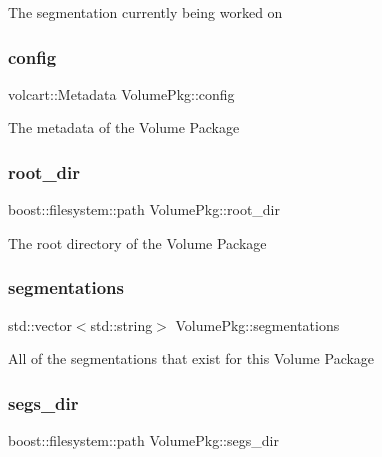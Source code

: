 The segmentation currently being worked on \hypertarget{classVolumePkg_a01960fbb8a1dec9da54f5e2468baeb0e}{}\label{classVolumePkg_a01960fbb8a1dec9da54f5e2468baeb0e} 
\subsubsection{\texorpdfstring{config}{config}}
{\footnotesize\ttfamily volcart\+::\+Metadata Volume\+Pkg\+::config\hspace{0.3cm}{\ttfamily [private]}}

The metadata of the Volume Package \hypertarget{classVolumePkg_a564d5b92303bb807979d0ab09afa8eec}{}\label{classVolumePkg_a564d5b92303bb807979d0ab09afa8eec} 
\subsubsection{\texorpdfstring{root\+\_\+dir}{root\_dir}}
{\footnotesize\ttfamily boost\+::filesystem\+::path Volume\+Pkg\+::root\+\_\+dir\hspace{0.3cm}{\ttfamily [private]}}

The root directory of the Volume Package \hypertarget{classVolumePkg_a2c66b1685cb4b0be679097a61acb822b}{}\label{classVolumePkg_a2c66b1685cb4b0be679097a61acb822b} 
\subsubsection{\texorpdfstring{segmentations}{segmentations}}
{\footnotesize\ttfamily std\+::vector$<$std\+::string$>$ Volume\+Pkg\+::segmentations\hspace{0.3cm}{\ttfamily [private]}}

All of the segmentations that exist for this Volume Package \hypertarget{classVolumePkg_a7093bd35d5d8d7ef0b50a1e182bfbf56}{}\label{classVolumePkg_a7093bd35d5d8d7ef0b50a1e182bfbf56} 
\subsubsection{\texorpdfstring{segs\+\_\+dir}{segs\_dir}}
{\footnotesize\ttfamily boost\+::filesystem\+::path Volume\+Pkg\+::segs\+\_\+dir\hspace{0.3cm}{\ttfamily [private]}}

